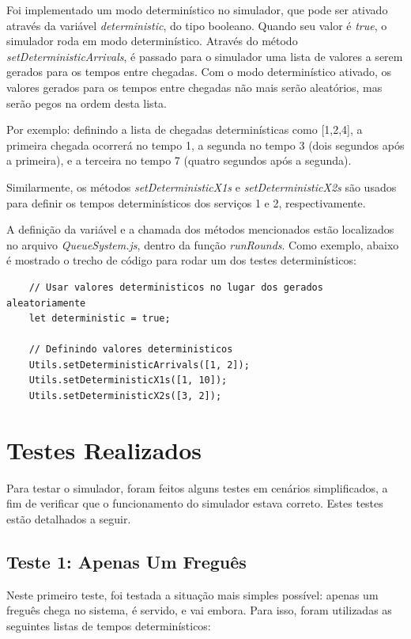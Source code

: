 \documentclass[a4paper,12pt]{report}
\begin{document}
Foi implementado um modo determinístico no simulador, que pode ser ativado através da variável \emph{deterministic}, do tipo booleano. Quando seu valor é \emph{true}, o simulador roda em modo determinístico.
Através do método \emph{setDeterministicArrivals}, é passado para o simulador uma lista de valores a serem gerados para os tempos entre chegadas. Com o modo determinístico ativado, os valores gerados para os tempos entre chegadas não mais serão aleatórios, mas serão pegos na ordem desta lista.

Por exemplo: definindo a lista de chegadas determinísticas como [1,2,4], a primeira chegada ocorrerá no tempo 1, a segunda no tempo 3 (dois segundos após a primeira), e a terceira no tempo 7 (quatro segundos após a segunda).

Similarmente, os métodos \emph{setDeterministicX1s} e \emph{setDeterministicX2s} são usados para definir os tempos determinísticos dos serviços 1 e 2, respectivamente.

A definição da variável e a chamada dos métodos mencionados estão localizados no arquivo \emph{QueueSystem.js}, dentro da função \emph{runRounds}. Como exemplo, abaixo é mostrado o trecho de código para rodar um dos testes determinísticos:

\begin{lstlisting}
	// Usar valores deterministicos no lugar dos gerados aleatoriamente
	let deterministic = true;

	// Definindo valores deterministicos
	Utils.setDeterministicArrivals([1, 2]);
	Utils.setDeterministicX1s([1, 10]);
	Utils.setDeterministicX2s([3, 2]);
\end{lstlisting}


\section{Testes Realizados}

Para testar o simulador, foram feitos alguns testes em cenários simplificados, a fim de verificar que o funcionamento do simulador estava correto. Estes testes estão detalhados a seguir.


\subsection{Teste 1: Apenas Um Freguês}
Neste primeiro teste, foi testada a situação mais simples possível: apenas um freguês chega no sistema, é servido, e vai embora. Para isso, foram utilizadas as seguintes listas de tempos determinísticos:
\end{document}
